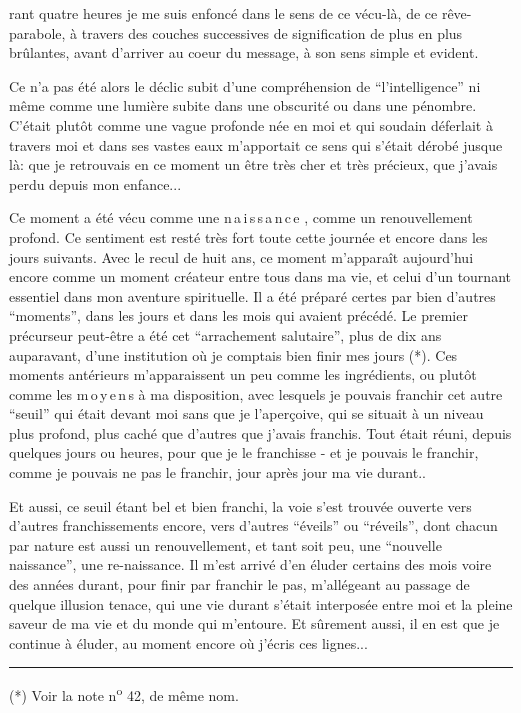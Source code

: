 
rant quatre heures je me suis enfoncé dans le sens de ce vécu-là, de ce rêve-parabole, à travers des couches successives de signification de plus en plus brûlantes, avant d'arriver au coeur du message, à son sens simple et evident.

Ce n'a pas été alors le déclic subit d'une compréhension de ``l'intelligence''\handwritten{,} ni même comme une lumière subite dans une obscurité ou dans une pénombre. C'était plutôt comme une vague profonde née en moi et qui soudain déferlait à travers moi et dans ses vastes eaux m'apportait ce sens qui s'était dérobé jusque là: que je retrouvais en ce moment un être très cher et très précieux, que j'avais perdu depuis mon enfance...

Ce moment a été vécu comme une n\,a\,i\,s\,s\,a\,n\,c\,e , comme un renouvellement profond. Ce sentiment est resté très fort toute cette journée\handwritten{,} et encore dans les jours suivants. Avec le recul de huit ans, ce moment m'apparaît aujourd'hui encore comme un moment créateur entre tous dans ma vie, et celui d'un tournant essentiel dans mon aventure spirituelle. Il a été préparé certes par bien d'autres ``moments'', dans les jours et dans les mois qui avaient précédé. Le premier précurseur peut-être a été cet ``arrachement salutaire'', plus de dix ans auparavant, d'une institution où je comptais bien finir mes jours (*). Ces moments antérieurs m'apparaissent un peu comme les ingrédients, ou plutôt comme les m\unsure{\textperiodcentered|}\,o\,y\,e\,n\,s à ma disposition, avec lesquels je pouvais franchir cet autre ``seuil'' qui était devant moi sans que je l'aperçoive, qui se situait à un niveau plus profond, plus caché que d'autres que j'avais franchis. Tout était réuni, depuis quelques jours ou heures, pour que je le franchisse - et je pouvais le franchir, comme je pouvais ne pas le franchir, jour après jour ma vie durant..

Et aussi, ce seuil étant bel et bien franchi, la voie s'est trouvée ouverte vers d'autres franchissements encore, vers d'autres ``éveils'' ou ``réveils'', dont chacun par nature est aussi un renouvellement, et tant soit peu, une \unsure{:|}``nouvelle naissance'', une re-naissance. Il m'est arrivé d'en éluder certains des mois voire des années durant, pour finir par franchir le pas, m'allégeant au passage de quelque illusion tenace, qui une vie durant s'était interposée entre moi et la pleine saveur de ma vie et du monde qui m'entoure. Et sûrement aussi, il en est que je continue à éluder, au moment encore où j'écris ces lignes...

\noindent\rule{5em}{0.3pt}\par
(*) Voir la note n\textsuperscript{o} 42, de même nom.

